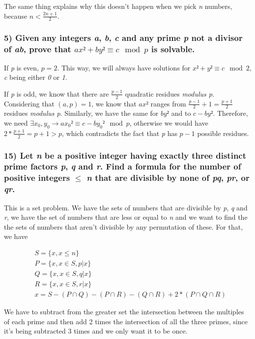 \documentclass[11pt]{article}
\begin{document}
The same thing explains why this doesn't happen when we pick \emph{n} numbers, because \(n < \frac{2n+1}{2}\). 

\subsubsection*{5) Given any integers \emph{a}, \emph{b}, \emph{c} and any prime \emph{p} not a divisor of \emph{ab}, prove that \(ax² + by² \equiv c \mod p\) is solvable.}
\label{sec:org2b15a6c}

If \emph{p} is even, \(p = 2\). This way, we will always have solutions for \(x² + y² \equiv c \mod 2\), \emph{c} being either \emph{0} or \emph{1}.

If \emph{p} is odd, we know that there are \(\frac{p-1}{2}\) quadratic residues \emph{modulus p}. Considering that \((a, p) = 1\), we know that \(ax²\) ranges from \(\frac{p-1}{2} + 1 = \frac{p+1}{2}\) residues \emph{modulus p}. Similarly, we have the same for \(by²\) and to \(c - by²\). Therefore, we need \(\exists x_0, y_0 \to ax_0² \equiv c - by_0² \mod p\), otherwise we would have \(2*\frac{p+1}{2} = p+1 > p\), which contradicts the fact that \emph{p} has \(p-1\) possible residues.

\subsubsection*{15) Let \emph{n} be a positive integer having exactly three distinct prime factors \emph{p}, \emph{q} and \emph{r}. Find a formula for the number of positive integers \(\le\) \emph{n} that are divisible by none of \emph{pq}, \emph{pr}, or \emph{qr}.}
\label{sec:org1f4e45d}

This is a set problem. We have the sets of numbers that are divisible by \emph{p}, \emph{q} and \emph{r}, we have the set of numbers that are less or equal to \emph{n} and we want to find the the sets of numbers that aren't divisible by any permutation of these. For that, we have

\begin{eqnarray}
  &S = \{x, x \le n\} \\
  &P = \{x, x \in S, p|x\} \\
  &Q = \{x, x \in S, q|x\} \\
  &R = \{x, x \in S, r|x\} \\
  &x = S - (P \cap Q) - (P \cap R) - (Q \cap R) + 2 * (P \cap Q \cap R)
\end{eqnarray}

We have to subtract from the greater set the intersection between the multiples of each prime and then add 2 times the intersection of all the three primes, since it's being subtracted 3 times and we only want it to be once.
\end{document}
